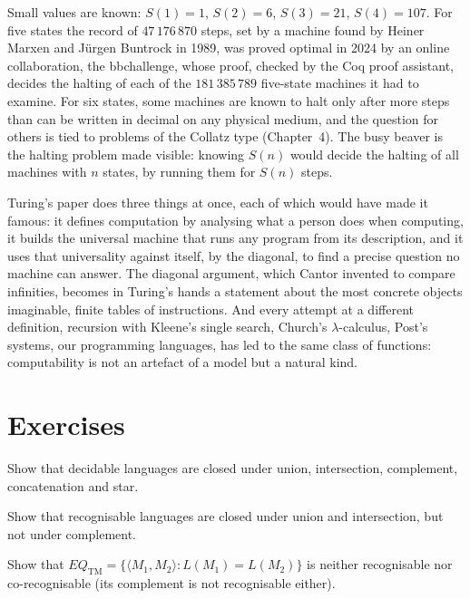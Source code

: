 Small values are known: $S(1)=1$, $S(2)=6$, $S(3)=21$, $S(4)=107$. For five states the record of $47\,176\,870$ steps, set by a machine found by Heiner Marxen and Jürgen Buntrock in 1989, was proved optimal in 2024 by an online collaboration, the bbchallenge, whose proof, checked by the Coq proof assistant, decides the halting of each of the $181\,385\,789$ five-state machines it had to examine. For six states, some machines are known to halt only after more steps than can be written in decimal on any physical medium, and the question for others is tied to problems of the Collatz type (Chapter~4). The busy beaver is the halting problem made visible: knowing $S(n)$ would decide the halting of all machines with $n$ states, by running them for $S(n)$ steps.

\begin{beauty}
Turing's paper does three things at once, each of which would have made it famous: it defines computation by analysing what a person does when computing, it builds the universal machine that runs any program from its description, and it uses that universality against itself, by the diagonal, to find a precise question no machine can answer. The diagonal argument, which Cantor invented to compare infinities, becomes in Turing's hands a statement about the most concrete objects imaginable, finite tables of instructions. And every attempt at a different definition, recursion with Kleene's single search, Church's $\lambda$-calculus, Post's systems, our programming languages, has led to the same class of functions: computability is not an artefact of a model but a natural kind.
\end{beauty}

\section{Exercises}

\begin{exercise}[$\star$]\label{ex:closure}
Show that decidable languages are closed under union, intersection, complement, concatenation and star.
\end{exercise}

\begin{exercise}[$\star$]\label{ex:recogclosure}
Show that recognisable languages are closed under union and intersection, but not under complement.
\end{exercise}

\begin{exercise}[$\star\star$]\label{ex:eqtm}
Show that $EQ_{\mathrm{TM}}=\{\langle M_1,M_2\rangle:L(M_1)=L(M_2)\}$ is neither recognisable nor co-recognisable (its complement is not recognisable either).
\end{exercise}

